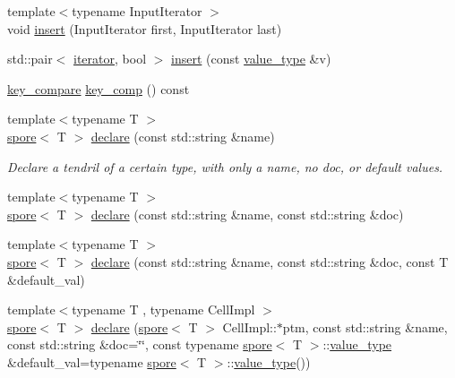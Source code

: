 \begin{DoxyCompactItemize}
\item 
{\footnotesize template$<$typename Input\-Iterator $>$ }\\void \hyperlink{classecto_1_1tendrils_ac8926dfa72716d030751e09f6461fa6c}{insert} (Input\-Iterator first, Input\-Iterator last)
\item 
std\-::pair$<$ \hyperlink{classecto_1_1tendrils_a6f0b7bd6e3a03f047351303630b889e0}{iterator}, bool $>$ \hyperlink{classecto_1_1tendrils_a98adbbe057fc34545cd51c7deeafca2f}{insert} (const \hyperlink{classecto_1_1tendrils_a736870868e76890e198448924cecdd4f}{value\-\_\-type} \&v)
\item 
\hyperlink{classecto_1_1tendrils_aa347bebda44153437e8554a25bed9e6b}{key\-\_\-compare} \hyperlink{classecto_1_1tendrils_ab56662cb08014858ce9df9403a357954}{key\-\_\-comp} () const 
\item 
{\footnotesize template$<$typename T $>$ }\\\hyperlink{structecto_1_1spore}{spore}$<$ T $>$ \hyperlink{classecto_1_1tendrils_aebef8c562cb501738d2a7f8fa5e53518}{declare} (const std\-::string \&name)
\begin{DoxyCompactList}\small\item\em Declare a tendril of a certain type, with only a name, no doc, or default values. \end{DoxyCompactList}\item 
{\footnotesize template$<$typename T $>$ }\\\hyperlink{structecto_1_1spore}{spore}$<$ T $>$ \hyperlink{classecto_1_1tendrils_a58b219396a7e5ca2f2876efc2f66aa38}{declare} (const std\-::string \&name, const std\-::string \&doc)
\item 
{\footnotesize template$<$typename T $>$ }\\\hyperlink{structecto_1_1spore}{spore}$<$ T $>$ \hyperlink{classecto_1_1tendrils_a89e7ed34481d3ed987ddfd5ba35174ae}{declare} (const std\-::string \&name, const std\-::string \&doc, const T \&default\-\_\-val)
\item 
{\footnotesize template$<$typename T , typename Cell\-Impl $>$ }\\\hyperlink{structecto_1_1spore}{spore}$<$ T $>$ \hyperlink{classecto_1_1tendrils_a65a2a2745bd52ccc827c63d4cc016224}{declare} (\hyperlink{structecto_1_1spore}{spore}$<$ T $>$ Cell\-Impl\-::$\ast$ptm, const std\-::string \&name, const std\-::string \&doc=\char`\"{}\char`\"{}, const typename \hyperlink{structecto_1_1spore}{spore}$<$ T $>$\-::\hyperlink{classecto_1_1tendrils_a736870868e76890e198448924cecdd4f}{value\-\_\-type} \&default\-\_\-val=typename \hyperlink{structecto_1_1spore}{spore}$<$ T $>$\-::\hyperlink{classecto_1_1tendrils_a736870868e76890e198448924cecdd4f}{value\-\_\-type}())

\end{DoxyCompactItemize}
